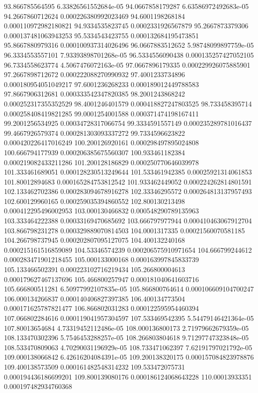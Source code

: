 {93.866785564595 6.33826561552684e-05
94.0667858179287 6.63586972492683e-05
94.2667860712624 0.000226380992023469
94.6001198268184 0.000110972982180821
94.9334535823745 0.0002331926567879
95.2667873379306 0.000137481063943253
95.5334543423755 0.000132684195473851
95.8667880979316 0.000100937314026496
96.0667883512652 5.98748099897759e-05
96.3334553557101 7.93393898701268e-05
96.5334556090438 0.000135257427052105
96.7334558623774 4.5067476072163e-05
97.0667896179335 0.000229926075885901
97.2667898712672 0.000222088270990932
97.4001233734896 0.000180954051049217
97.6001236268233 0.000189012449788583
97.8667906312681 0.000333542347820385
98.2001243868242 0.000252317355352529
98.4001246401579 0.000418827247803525
98.733458395714 0.000258408419821285
99.0001254001588 0.000371474198167411
99.2001256534925 0.00034728317066754
99.3334591557149 0.000235289781016437
99.4667926579374 0.000281303093337272
99.7334596623822 0.000420226417016249
100.200126920161 0.000298497895024808
100.666794177939 0.000206385675560307
100.933461182384 0.000219082433211286
101.200128186829 0.000250770646039978
101.333461689051 0.000128230513249644
101.533461942385 0.00025921314061853
101.80012894683 0.000165284753812542
101.933462449052 0.000224262814801591
102.133462702386 0.000283094678916278
102.33346295572 0.000264813137957493
102.600129960165 0.000259035394860552
102.800130213498 0.000412295496002953
103.000130466832 0.000548290789135963
103.333464222388 0.00033169470685692
103.666797977944 0.000410463067912704
103.866798231278 0.000329889070814503
104.0001317335 0.00021560070581185
104.266798737945 0.000202807095127075
104.400132240168 0.000215161516859089
104.53346574239 0.000206575910971654
104.666799244612 0.000283471901218455
105.000133000168 0.000163997845833739
105.133466502391 0.000223102716219434
105.266800004613 0.000179627467137696
105.466800257947 0.000181040641603716
105.666800511281 6.50977992107835e-05
105.866800764614 0.000106609104700247
106.000134266837 0.000140406827397385
106.400134773504 0.000171625787821477
106.866802031283 0.000122595954460394
107.066802284616 0.000119041957304597
107.533469542395 5.54479146421364e-05
107.80013654684 4.73319452112486e-05
108.000136800173 2.71979662679359e-05
108.133470302396 5.7546453288257e-05
108.266803804618 9.71297747323848e-05
108.533470809063 4.70290031196929e-05
108.733471062397 7.62191797021792e-05
109.000138066842 6.42616204084391e-05
109.200138320175 0.000157084823978876
109.400138573509 0.000161482548314232
109.533472075731 0.000194436186699201
109.800139080176 0.000186124068643228
110.00013933351 0.000197482934760368
}
